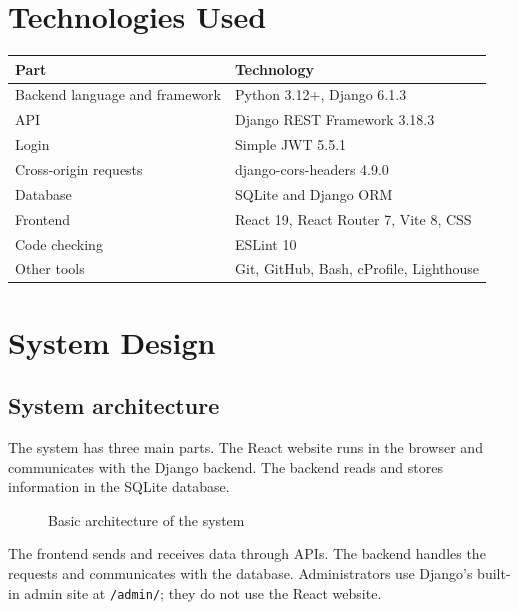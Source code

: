 \documentclass[11pt,a4paper]{article}
\begin{document}
\section{Technologies Used}

\begin{table}[H]
\centering
\begin{tabular}{ll}
\toprule
\textbf{Part} & \textbf{Technology} \\
\midrule
Backend language and framework & Python 3.12+, Django 6.1.3 \\
API & Django REST Framework 3.18.3 \\
Login & Simple JWT 5.5.1 \\
Cross-origin requests & django-cors-headers 4.9.0 \\
Database & SQLite and Django ORM \\
Frontend & React 19, React Router 7, Vite 8, CSS \\
Code checking & ESLint 10 \\
Other tools & Git, GitHub, Bash, cProfile, Lighthouse \\
\bottomrule
\end{tabular}
\end{table}

\section{System Design}

\subsection{System architecture}
The system has three main parts. The React website runs in the browser and
communicates with the Django backend. The backend reads and stores information
in the SQLite database.

\begin{figure}[H]
\centering
{}
\caption{Basic architecture of the system}
\end{figure}

The frontend sends and receives data through APIs. The backend handles the
requests and communicates with the database. Administrators use Django's
built-in admin site at \texttt{/admin/}; they do not use the React website.
\end{document}
